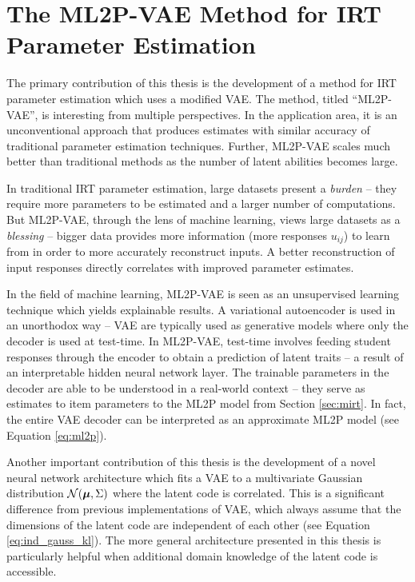 \chapter{The ML2P-VAE Method for IRT Parameter Estimation}\label{ch:ml2pvae_methods}
The primary contribution of this thesis is the development of a method for IRT parameter estimation which uses a modified VAE. The method, titled ``ML2P-VAE'', is interesting from multiple perspectives. In the application area, it is an unconventional approach that produces estimates with similar accuracy of traditional parameter estimation techniques. Further, ML2P-VAE scales much better than traditional methods as the number of latent abilities becomes large. 

In traditional IRT parameter estimation, large datasets present a \textit{burden} -- they require more parameters to be estimated and a larger number of computations. But ML2P-VAE, through the lens of machine learning, views large datasets as a \textit{blessing} -- bigger data provides more information (more responses $u_{ij}$) to learn from in order to more accurately reconstruct inputs. A better reconstruction of input responses directly correlates with improved parameter estimates.

In the field of machine learning, ML2P-VAE is seen as an unsupervised learning technique which yields explainable results. A variational autoencoder is used in an unorthodox way -- VAE are typically used as generative models where only the decoder is used at test-time. In ML2P-VAE, test-time involves feeding student responses through the encoder to obtain a prediction of latent traits -- a result of an interpretable hidden neural network layer. The trainable parameters in the decoder are able to be understood in a real-world context -- they serve as estimates to item parameters to the ML2P model from Section \ref{sec:mirt}. In fact, the entire VAE decoder can be interpreted as an approximate ML2P model (see Equation \ref{eq:ml2p}).

Another important contribution of this thesis is the development of a novel neural network architecture which fits a VAE to a multivariate Gaussian distribution $\mathcal{N}(\boldsymbol{\mu}, \Sigma)$ where the latent code is correlated. This is a significant difference from previous implementations of VAE, which always assume that the dimensions of the latent code are independent of each other (see Equation \ref{eq:ind_gauss_kl}). The more general architecture presented in this thesis is particularly helpful when additional domain knowledge of the latent code is accessible.

